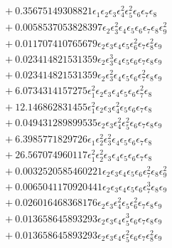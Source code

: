 \documentclass[10pt]{article}
\begin{document}
\begin{align*}
&{}  + 0.35675149308821 \epsilon_{1} \epsilon_{2} \epsilon_{3} \epsilon_{4}^{2} \epsilon_{5}^{2} \epsilon_{6} \epsilon_{7} \epsilon_{8} \\
&{}  + 0.0058537053828397 \epsilon_{2} \epsilon_{3}^{2} \epsilon_{4} \epsilon_{5} \epsilon_{6} \epsilon_{7} \epsilon_{8} \epsilon_{9}^{2} \\
&{}  + 0.011707410765679 \epsilon_{2} \epsilon_{3} \epsilon_{4} \epsilon_{5} \epsilon_{6}^{2} \epsilon_{7} \epsilon_{8}^{2} \epsilon_{9} \\
&{}  + 0.023414821531359 \epsilon_{2} \epsilon_{3}^{3} \epsilon_{4} \epsilon_{5} \epsilon_{6} \epsilon_{7} \epsilon_{8} \epsilon_{9} \\
&{}  + 0.023414821531359 \epsilon_{2} \epsilon_{3}^{2} \epsilon_{4} \epsilon_{5} \epsilon_{6} \epsilon_{7}^{2} \epsilon_{8} \epsilon_{9} \\
&{}  + 6.0734314157275 \epsilon_{1}^{2} \epsilon_{2} \epsilon_{3} \epsilon_{4} \epsilon_{5} \epsilon_{6} \epsilon_{7}^{2} \epsilon_{8} \\
&{}  + 12.146862831455 \epsilon_{1}^{2} \epsilon_{2} \epsilon_{3} \epsilon_{4}^{2} \epsilon_{5} \epsilon_{6} \epsilon_{7} \epsilon_{8} \\
&{}  + 0.049431289899535 \epsilon_{2} \epsilon_{3} \epsilon_{4}^{2} \epsilon_{5}^{2} \epsilon_{6} \epsilon_{7} \epsilon_{8} \epsilon_{9} \\
&{}  + 6.3985771829726 \epsilon_{1} \epsilon_{2}^{2} \epsilon_{3}^{2} \epsilon_{4} \epsilon_{5} \epsilon_{6} \epsilon_{7} \epsilon_{8} \\
&{}  + 26.567074960117 \epsilon_{1}^{2} \epsilon_{2}^{2} \epsilon_{3} \epsilon_{4} \epsilon_{5} \epsilon_{6} \epsilon_{7} \epsilon_{8} \\
&{}  + 0.0032520585460221 \epsilon_{2} \epsilon_{3} \epsilon_{4} \epsilon_{5} \epsilon_{6} \epsilon_{7}^{2} \epsilon_{8} \epsilon_{9}^{2} \\
&{}  + 0.0065041170920441 \epsilon_{2} \epsilon_{3} \epsilon_{4} \epsilon_{5} \epsilon_{6} \epsilon_{7}^{3} \epsilon_{8} \epsilon_{9} \\
&{}  + 0.026016468368176 \epsilon_{2} \epsilon_{3} \epsilon_{4}^{2} \epsilon_{5} \epsilon_{6}^{2} \epsilon_{7} \epsilon_{8} \epsilon_{9} \\
&{}  + 0.013658645893293 \epsilon_{2} \epsilon_{3} \epsilon_{4} \epsilon_{5}^{3} \epsilon_{6} \epsilon_{7} \epsilon_{8} \epsilon_{9} \\
&{}  + 0.013658645893293 \epsilon_{2} \epsilon_{3} \epsilon_{4} \epsilon_{5}^{2} \epsilon_{6} \epsilon_{7} \epsilon_{8}^{2} \epsilon_{9} \\

\end{align*}
\end{document}
